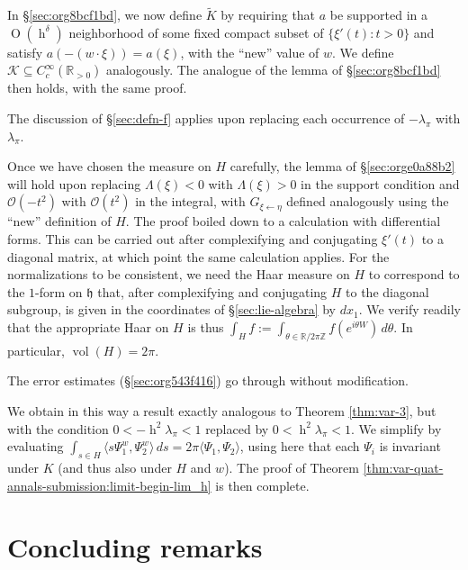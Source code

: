 \documentclass[reqno,10pt]{amsart}
\theoremstyle{plain} %
\theoremstyle{definition}
\theoremstyle{plain} %
\theoremstyle{remark}
\theoremstyle{itplain} %
\theoremstyle{remark} %
\numberwithin{equation}{section}
\def\O{\operatorname{O}}
\DeclareMathOperator{\vol}{vol}
\DeclareMathOperator{\h}{h}
\begin{document}
In \S\ref{sec:org8bcf1bd}, we now define $\tilde{K}$ by requiring that $a$ be supported in a $\O(\h^\delta)$ neighborhood of some fixed compact subset of $\{\xi '(t) : t > 0\}$ and satisfy $a(-(w \cdot \xi)) = a(\xi)$, with the ``new'' value of $w$.  We define $\mathcal{K} \subseteq C_c^\infty(\mathbb{R}_{>0})$ analogously.  The analogue of the lemma of \S\ref{sec:org8bcf1bd} then holds, with the same proof.

The discussion of \S\ref{sec:defn-f} applies upon replacing each occurrence of $-\lambda_\pi$ with $\lambda_\pi$.


Once we have chosen the measure on $H$ carefully, the lemma of \S\ref{sec:orge0a88b2} will hold upon replacing $\Lambda(\xi) < 0$ with $\Lambda(\xi) > 0$ in the support condition and $\mathcal{O}(-t^2)$ with $\mathcal{O}(t^2)$ in the integral, with $G_{\xi \leftarrow \eta}$ defined analogously using the ``new'' definition of $H$.  The proof boiled down to a calculation with differential forms.  This can be carried out after complexifying and conjugating $\xi '(t)$ to a diagonal matrix, at which point the same calculation applies.  For the normalizations to be consistent, we need the Haar measure on $H$ to correspond to the $1$-form on $\mathfrak{h}$ that, after complexifying and conjugating $H$ to the diagonal subgroup, is given in the coordinates of \S\ref{sec:lie-algebra} by $d x_1$.  We verify readily that the appropriate Haar on $H$ is thus $\int _{H} f := \int _{\theta \in \mathbb{R} / 2 \pi \mathbb{Z} } f(e^{i \theta W}) \, d \theta$.  In particular, $\vol(H) = 2 \pi$.

The error estimates (\S\ref{sec:org543f416}) go through without modification.

We obtain in this way a result exactly analogous to Theorem \ref{thm:var-3}, but with the condition $0 < -\h^2 \lambda_\pi < 1$ replaced by $0 < \h^2 \lambda_\pi < 1$.  We simplify by evaluating $\int_{s \in H} \langle s \Psi_1^w, \Psi_2^w \rangle \,d s = 2 \pi \langle \Psi_1, \Psi_2 \rangle$, using here that each $\Psi_i$ is invariant under $K$ (and thus also under $H$ and $w$).  The proof of Theorem \ref{thm:var-quat-annals-submission:limit-begin-lim_h} is then complete.



\section{Concluding remarks}\label{sec:35ac3e57a7}
\end{document}
